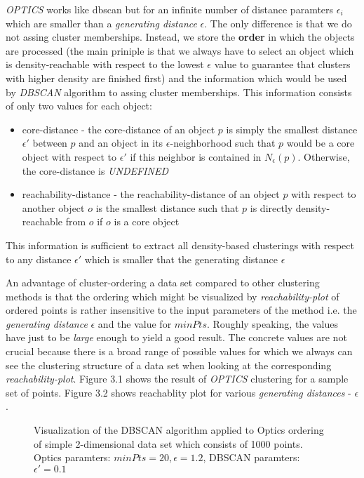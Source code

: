 \textit{OPTICS} works like dbscan but for an infinite number of distance
paramters $\epsilon_i$ which are smaller than a \textit{generating distance}
$\epsilon$. The only difference is that we do not assing cluster memberships.
Instead, we store the \textbf{order} in which the objects are processed (the
main priniple is that we always have to select an object which is
density-reachable with respect to the lowest $\epsilon$ value to guarantee that
clusters with higher density are finished first) and the information which would
be used by \textit{DBSCAN} algorithm to assing cluster memberships. This
information consists of only two values for each object:
\begin{itemize}
  \item core-distance - the core-distance of an object $p$ is simply the
  smallest distance $\epsilon'$ between $p$ and an object in its
  $\epsilon$-neighborhood such that $p$ would be a core object with respect to
  $\epsilon'$ if this neighbor is contained in $N_\epsilon(p)$. Otherwise, the
  core-distance is \textit{UNDEFINED}
  \item reachability-distance - the reachability-distance of an object $p$ with
  respect to another object $o$ is the smallest distance such that $p$ is
  directly density-reachable from $o$ if $o$ is a core object
\end{itemize}

This information is sufficient to extract all density-based clusterings
with respect to any distance $\epsilon'$ which is smaller that the generating
distance $\epsilon$

An advantage of cluster-ordering a data set compared to other clustering methods
is that the ordering which might be visualized by \textit{reachability-plot} of
ordered points is rather insensitive to the input parameters of the method i.e.
the \textit{generating distance} $\epsilon$ and the value for $minPts$. Roughly
speaking, the values have just to be \textit{large} enough to yield a good
result. The concrete values are not crucial because there is a broad range of
possible values for which we always can see the clustering structure of a data
set when looking at the corresponding \textit{reachability-plot}. Figure 3.1
shows the result of \textit{OPTICS} clustering for a sample set of points.
Figure 3.2 shows reachablity plot for various \textit{generating distances} -
$\epsilon$.

\begin{figure}
  \centering
  \caption{Visualization of the DBSCAN algorithm applied to Optics ordering
  of simple 2-dimensional data set which consists of 1000 points. Optics
  paramters: $minPts=20, \epsilon=1.2$, DBSCAN paramters: $\epsilon'=0.1$ }
  \label{clusters}
\end{figure}



